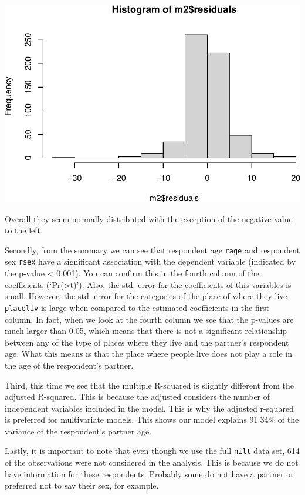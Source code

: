 \documentclass[
]{book}
\begin{document}
\begin{flushleft}\includegraphics[width=1\linewidth]{lab-workbook_files/figure-latex/unnamed-chunk-112-1} \end{flushleft}

Overall they seem normally distributed with the exception of the negative value to the left.

Secondly, from the summary we can see that respondent age \texttt{rage} and respondent sex \texttt{rsex} have a significant association with the dependent variable (indicated by the p-value \textless{} 0.001). You can confirm this in the fourth column of the coefficients (`Pr(\textgreater\textbar t\textbar)'). Also, the std. error for the coefficients of this variables is small. However, the std. error for the categories of the place of where they live \texttt{placeliv} is large when compared to the estimated coefficients in the first column. In fact, when we look at the fourth column we see that the p-values are much larger than 0.05, which means that there is not a significant relationship between any of the type of places where they live and the partner's respondent age. What this means is that the place where people live does not play a role in the age of the respondent's partner.

Third, this time we see that the multiple R-squared is slightly different from the adjusted R-squared. This is because the adjusted considers the number of independent variables included in the model. This is why the adjusted r-squared is preferred for multivariate models. This shows our model explains 91.34\% of the variance of the respondent's partner age.

Lastly, it is important to note that even though we use the full \texttt{nilt} data set, 614 of the observations were not considered in the analysis. This is because we do not have information for these respondents. Probably some do not have a partner or preferred not to say their sex, for example.
\end{document}
